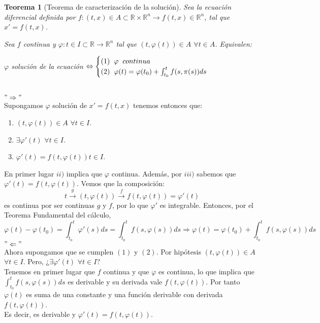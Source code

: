 \documentclass{article}
\makeatletter
\theoremstyle{theorem-style}  %
\newtheorem{theorem}{Teorema}[section]  %
\theoremstyle{definition-style}
\theoremstyle{example-style}
\renewenvironment{proof}[1][\proofname]{\par
	\pushQED{\qed}%
	\normalfont \topsep6\p@\@plus6\p@\relax
	\list{}{%
		\settowidth{\leftmargin}{\quad:\hskip\labelsep}%
		\setlength{\labelwidth}{0pt}%
		\setlength{\itemindent}{-\leftmargin}%
	}%
	\item[\hskip\labelsep\itshape#1\@addpunct{:}]\ignorespaces
}{%
	\popQED\endlist\@endpefalse
}
\makeatother
\begin{document}
\begin{theorem}[Teorema de caracterización de la solución]\label{carac-sol}
	Sea la ecuación diferencial definida por $ f:(t,x) \in A \subset \mathbb{R}\times \mathbb{R}^n\longrightarrow f(t,x)\in \mathbb{R}^n$, tal que $ x'=f(t,x) $. 
	
	Sea $f$ continua y $\varphi :t \in I \subset \mathbb{R} \longrightarrow \mathbb{R}^n$ tal que $(t, \varphi (t)) \in A$ $\forall t \in A$. Equivalen:
	\begin{center}
		$\varphi$ solución de la ecuación $\Leftrightarrow \begin{cases}
		(1) \hspace{0,2cm} \varphi \hspace{0,2cm} continua \\
		(2) \hspace{0,2cm} \varphi (t)= \varphi (t_0) + \int_{t_0}^{t} f(s, \pi (s))ds
		\end{cases}$
	\end{center}
\end{theorem}
\begin{proof}\ \\
	$"\Rightarrow"$ \\
	Supongamos $\varphi$ solución de $x' = f(t, x)$ tenemos entonces que:
	\begin{enumerate}[\qquad i)]
	\item $(t, \varphi (t)) \in A$ $\forall t \in I$.
	\item $ \exists \varphi' (t)$ $\forall t \in I$.
	\item $ \varphi' (t) = f(t, \varphi (t)) t \in I$.
	\end{enumerate}
	En primer lugar $ii)$ implica que $\varphi$ continua. Además, por $iii)$ sabemos que $\varphi' (t) = f(t, \varphi (t))$. Vemos que la composición:
	\[t \stackrel{g}{\longrightarrow } (t, \varphi (t)) \stackrel{f}{\longrightarrow } f(t, \varphi (t)) = \varphi'(t)\]
	es continua por ser continuas $g$ y $f$, por lo que $\varphi '$ es integrable. Entonces, por el Teorema Fundamental del cálculo,
	\[\varphi (t) - \varphi (t_0) = \int_{t_0}^{t} \varphi' (s)ds = \int_{t_0}^{t} f(s, \varphi (s))ds \Rightarrow \varphi (t) = \varphi (t_0) + \int_{t_0}^{t} f(s, \varphi (s))ds\]
	$"\Leftarrow"$ \\
	Ahora supongamos que se cumplen $(1)$ y $(2)$. Por hipótesis $(t, \varphi (t)) \in A$ $\forall t \in I$. Pero, ¿$\exists \varphi' (t)$ $\forall t \in I$?\\
	Tenemos en primer lugar que $f$ continua y que $\varphi$ es continua, lo que implica que $\int_{t_0}^{t} f(s, \varphi (s))ds$ es derivable y su derivada vale $f(t, \varphi (t))$. Por tanto $\varphi (t)$ es suma de una constante y una función derivable con derivada $ f(t,\varphi(t)) $. \\
	Es decir, es derivable y $\varphi' (t) = f(t, \varphi (t))$.
\end{proof}
\end{document}
